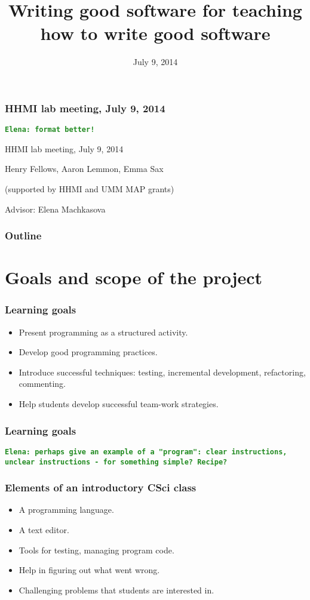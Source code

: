 \documentclass{beamer}
\newcommand{\comment}[1]{{\bf \tt  {#1}}}
\newcommand{\emcomment}[1]{\textcolor{ForestGreen}{\comment{Elena: {#1}}}}
\begin{document}
\title{Writing good software for teaching how to write good software}
\date{July 9, 2014}

\begin{frame}
\frametitle{HHMI lab meeting, July 9, 2014}
\emcomment{format better!}

{\centering
HHMI lab meeting, July 9, 2014 \par
}
Henry Fellows, Aaron Lemmon, Emma Sax\par
(supported by HHMI and UMM MAP grants)\par
Advisor: Elena Machkasova \par
\end{frame}

\begin{frame}[fragile]
\frametitle{Outline}
	\tableofcontents
\end{frame}


\section{Goals and scope of the project}

\begin{frame}[fragile]
\frametitle{Learning goals}
\begin{itemize}
\item Present programming as a structured activity.
\item Develop good programming practices.
\item Introduce successful techniques: testing, incremental development, refactoring, commenting. 
\item Help students develop successful team-work strategies. 
\end{itemize}
\end{frame}

\begin{frame}[fragile]
\frametitle{Learning goals}
\emcomment{perhaps give an example of a "program": clear instructions, unclear instructions - for something simple? Recipe?}
\end{frame}

\begin{frame}[fragile]
\frametitle{Elements of an introductory CSci class}
\begin{itemize}
\item A programming language. 
\item A text editor.
\item Tools for testing, managing program code. 
\item Help in figuring out what went wrong.
\item Challenging problems that students are interested in.
\end{itemize}
\end{frame}
\end{document}

